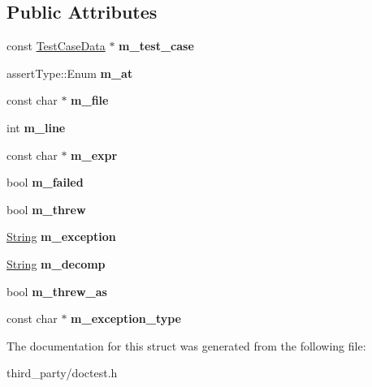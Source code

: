 \subsection*{Public Attributes}
\begin{DoxyCompactItemize}
\item 
\mbox{\label{structdoctest_1_1_assert_data_ab26ee6e05feaefc982c4f5481458cbda}} 
const \mbox{\hyperlink{structdoctest_1_1_test_case_data}{Test\+Case\+Data}} $\ast$ {\bfseries m\+\_\+test\+\_\+case}
\item 
\mbox{\label{structdoctest_1_1_assert_data_a0b3b2866b13ba048c0beea51bd798749}} 
assert\+Type\+::\+Enum {\bfseries m\+\_\+at}
\item 
\mbox{\label{structdoctest_1_1_assert_data_ac22c9ed0d8c6edec58c4b26a0a00e714}} 
const char $\ast$ {\bfseries m\+\_\+file}
\item 
\mbox{\label{structdoctest_1_1_assert_data_a1142f5fb5d171964b7677a9d23f81548}} 
int {\bfseries m\+\_\+line}
\item 
\mbox{\label{structdoctest_1_1_assert_data_af8fe9e24ffba3f575c7384a85f96297a}} 
const char $\ast$ {\bfseries m\+\_\+expr}
\item 
\mbox{\label{structdoctest_1_1_assert_data_ac9ddaf3e6532fdadba3c1f74eb931d4a}} 
bool {\bfseries m\+\_\+failed}
\item 
\mbox{\label{structdoctest_1_1_assert_data_a3e9d4c7eeff7c4fe310b0597bf7027b8}} 
bool {\bfseries m\+\_\+threw}
\item 
\mbox{\label{structdoctest_1_1_assert_data_a1fdbef933ef26c0bc174f9ec716924cd}} 
\mbox{\hyperlink{classdoctest_1_1_string}{String}} {\bfseries m\+\_\+exception}
\item 
\mbox{\label{structdoctest_1_1_assert_data_a1c6b5804b7dd4d8ba70126cb598f30bd}} 
\mbox{\hyperlink{classdoctest_1_1_string}{String}} {\bfseries m\+\_\+decomp}
\item 
\mbox{\label{structdoctest_1_1_assert_data_ace744d365532d299052c8a80a63f7079}} 
bool {\bfseries m\+\_\+threw\+\_\+as}
\item 
\mbox{\label{structdoctest_1_1_assert_data_a1c476dc606780aefdb7db2d7ca146199}} 
const char $\ast$ {\bfseries m\+\_\+exception\+\_\+type}
\end{DoxyCompactItemize}


The documentation for this struct was generated from the following file\+:\begin{DoxyCompactItemize}
\item 
third\+\_\+party/doctest.\+h\end{DoxyCompactItemize}
